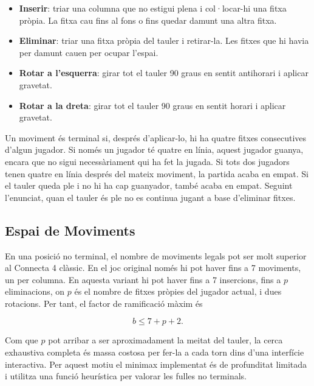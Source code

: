 \documentclass[conference,compsoc]{IEEEtran}
\begin{document}
\begin{itemize}
    \item \textbf{Inserir}: triar una columna que no estigui plena i col·locar-hi
          una fitxa pròpia. La fitxa cau fins al fons o fins quedar damunt una
          altra fitxa.
    \item \textbf{Eliminar}: triar una fitxa pròpia del tauler i retirar-la.
          Les fitxes que hi havia per damunt cauen per ocupar l'espai.
    \item \textbf{Rotar a l'esquerra}: girar tot el tauler 90 graus en sentit
          antihorari i aplicar gravetat.
    \item \textbf{Rotar a la dreta}: girar tot el tauler 90 graus en sentit
          horari i aplicar gravetat.
\end{itemize}

Un moviment és terminal si, després d'aplicar-lo, hi ha quatre fitxes consecutives
d'algun jugador. Si només un jugador té quatre en línia, aquest jugador guanya,
encara que no sigui necessàriament qui ha fet la jugada. Si tots dos jugadors
tenen quatre en línia després del mateix moviment, la partida acaba en empat. Si
el tauler queda ple i no hi ha cap guanyador, també acaba en empat. Seguint
l'enunciat, quan el tauler és ple no es continua jugant a base d'eliminar fitxes.

\subsection{Espai de Moviments}

En una posició no terminal, el nombre de moviments legals pot ser molt superior
al Connecta 4 clàssic. En el joc original només hi pot haver fins a 7 moviments,
un per columna. En aquesta variant hi pot haver fins a 7 insercions, fins a $p$
eliminacions, on $p$ és el nombre de fitxes pròpies del jugador actual, i dues
rotacions. Per tant, el factor de ramificació màxim és

\begin{equation}
    b \leq 7 + p + 2.
\end{equation}

Com que $p$ pot arribar a ser aproximadament la meitat del tauler, la cerca
exhaustiva completa és massa costosa per fer-la a cada torn dins d'una interfície
interactiva. Per aquest motiu el minimax implementat és de profunditat limitada i
utilitza una funció heurística per valorar les fulles no terminals.

\end{document}
